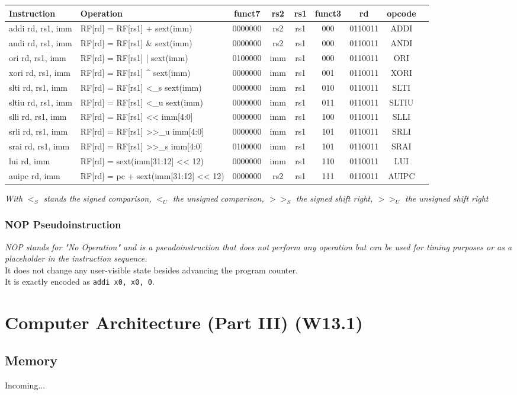 \documentclass[12pt,openany]{book}
\begin{document}
\begin{center}
	\begin{tabular}{|l|l|c|c|c|c|c|c|c|}
		\hline
		\textbf{Instruction} & \textbf{Operation} & \textbf{funct7} & \textbf{rs2} & \textbf{rs1} & \textbf{funct3} & \textbf{rd} & \textbf{opcode}  \\
		\hline
		addi rd, rs1, imm    & RF[rd] = RF[rs1] + sext(imm)  		 & 0000000 & rs2 & rs1 & 000  & 0110011 & ADDI     \\
		andi rd, rs1, imm    & RF[rd] = RF[rs1] \& sext(imm) 		 & 0000000 & rs2 & rs1 & 000  & 0110011 & ANDI       \\
		ori rd, rs1, imm     & RF[rd] = RF[rs1] | sext(imm)     	 & 0100000 & imm & rs1 & 000  & 0110011 & ORI       \\
		xori rd, rs1, imm    & RF[rd] = RF[rs1] \^{} sext(imm)  	 & 0000000 & imm & rs1 & 001  & 0110011 & XORI          \\
		slti rd, rs1, imm    & RF[rd] = RF[rs1] <\_s sext(imm)  	 & 0000000 & imm & rs1 & 010  & 0110011 & SLTI             \\
		sltiu rd, rs1, imm   & RF[rd] = RF[rs1] <\_u sext(imm)  	 & 0000000 & imm & rs1 & 011  & 0110011 & SLTIU            \\
		slli rd, rs1, imm    & RF[rd] = RF[rs1] << imm[4:0]  		 & 0000000 & imm & rs1 & 100  & 0110011 & SLLI                 \\
		srli rd, rs1, imm    & RF[rd] = RF[rs1] >>\_u imm[4:0]  	 & 0000000 & imm & rs1 & 101  & 0110011 & SRLI              \\
		srai rd, rs1, imm    & RF[rd] = RF[rs1] >>\_s imm[4:0]  	 & 0100000 & imm & rs1 & 101  & 0110011 & SRAI              \\
		lui rd, imm          & RF[rd] = sext(imm[31:12] << 12)  	 & 0000000 & imm & rs1 & 110  & 0110011 & LUI         \\
		auipc rd, imm        & RF[rd] = pc + sext(imm[31:12] << 12)  & 0000000 & rs2 & rs1 & 111  & 0110011 & AUIPC          \\
		\hline
	\end{tabular}
	
\end{center}
\textit{
	With $<_{S}$ stands the signed comparison,
	$<_{U}$ the unsigned comparison,
	$>>_{S}$ the signed shift right,
	$>>_{U}$ the unsigned shift right
	}
\subsection{NOP Pseudoinstruction}
\textit{NOP stands for "No Operation" and is a pseudoinstruction that does not perform any operation but can be used for timing purposes or as a placeholder in the instruction sequence.} \\
It does not change any user-visible state besides advancing the program counter.\\
It is exactly encoded as \texttt{addi x0, x0, 0}.

\chapter{Computer Architecture (Part III) (W13.1)}
\section{Memory }
Incoming...
\end{document}
